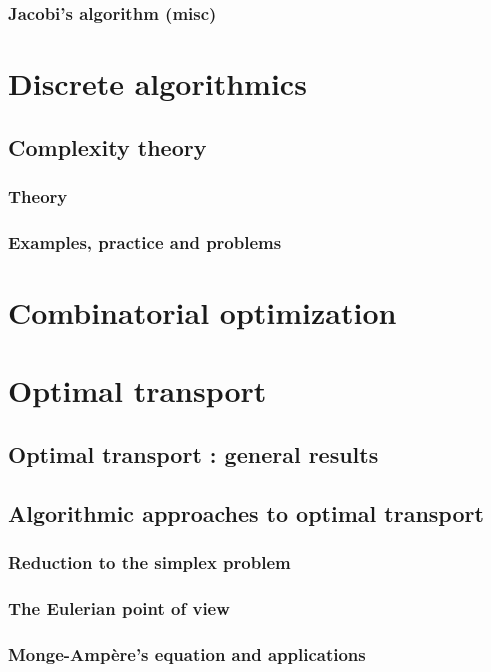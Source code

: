 \documentclass[12pt,openany,oneside]{book}
\begin{document}
\section{Jacobi's algorithm (misc)}

\part{Discrete algorithmics}

\chapter{Complexity theory}

\section{Theory}

\section{Examples, practice and problems}

\part{Combinatorial optimization}

\part{Optimal transport}

\chapter{Optimal transport : general  results}

\chapter{Algorithmic approaches to optimal transport}

\section{Reduction to the simplex problem}
\section{The Eulerian point of view}
\section{Monge-Ampère's equation and applications}
\end{document}
